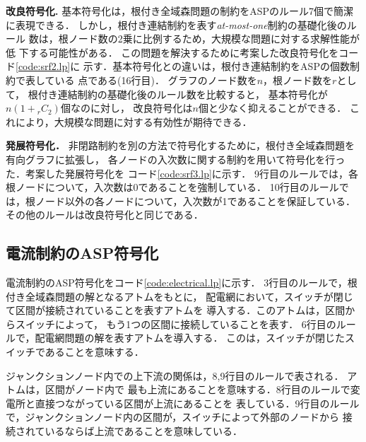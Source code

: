\textbf{改良符号化.}
基本符号化は，根付き全域森問題の制約をASPのルール7個で簡潔に表現できる．
しかし，根付き連結制約を表す\textit{at-most-one}制約の基礎化後のルール
数は，根ノード数の2乗に比例するため，大規模な問題に対する求解性能が低
下する可能性がある．
%
この問題を解決するために考案した改良符号化をコード\ref{code:srf2.lp}に
示す．基本符号化との違いは，根付き連結制約をASPの個数制約で表している
点である(16行目)．
グラフのノード数を$n$，根ノード数を$r$として，
根付き連結制約の基礎化後のルール数を比較すると，
基本符号化が$n(1+{}_{r}C_{2})$個なのに対し，
改良符号化は$n$個と少なく抑えることができる．
これにより，大規模な問題に対する有効性が期待できる．
 
\textbf{発展符号化．}
非閉路制約を別の方法で符号化するために，根付き全域森問題を有向グラフに拡張し，
各ノードの入次数に関する制約を用いて符号化を行った．考案した発展符号化を
コード\ref{code:srf3.lp}に示す．
9行目のルールでは，各根ノードについて，入次数は0であることを強制している．
10行目のルールでは，根ノード以外の各ノードについて，入次数が1であることを保証している．
その他のルールは改良符号化と同じである．

\subsection{電流制約のASP符号化}



電流制約のASP符号化をコード\ref{code:electrical.lp}に示す．
3行目のルールで，根付き全域森問題の解となるアトムをもとに，
配電網において，スイッチが閉じて区間が接続されていることを表すアトムを
導入する．このアトムは，区間からスイッチによって，
もう1つの区間に接続していることを表す．
6行目のルールで，配電網問題の解を表すアトムを導入する．
このは，スイッチが閉じたスイッチであることを意味する．

ジャンクションノード内での上下流の関係は，8,9行目のルールで表される．
アトムは，区間がノード内で
最も上流にあることを意味する．8行目のルールで変電所と直接つながっている区間が上流にあることを
表している．9行目のルールで，ジャンクションノード内の区間が，スイッチによって外部のノードから
接続されているならば上流であることを意味している．

